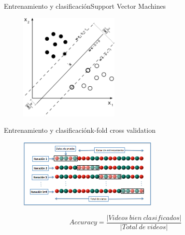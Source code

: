 \documentclass{beamer}
\begin{document}
        
        \begin{frame}{Entrenamiento y clasificación}{Support Vector Machines}
            \begin{figure}[bt]
        		\centering
                \includegraphics[width=5cm]{imagenes/support_vector_machines.png}
            \end{figure}
        \end{frame}
        
        \begin{frame}{Entrenamiento y clasificación}{k-fold cross validation}
            \begin{figure}[bt]
        		\centering
                \includegraphics[width=7cm]{imagenes/K-fold.jpg}
            \end{figure}
            \begin{equation}
            		Accuracy = \frac{|Videos~bien~clasificados|}{|Total~de~videos|} 
            \end{equation}
   
        \end{frame}
        
        
\end{document}
